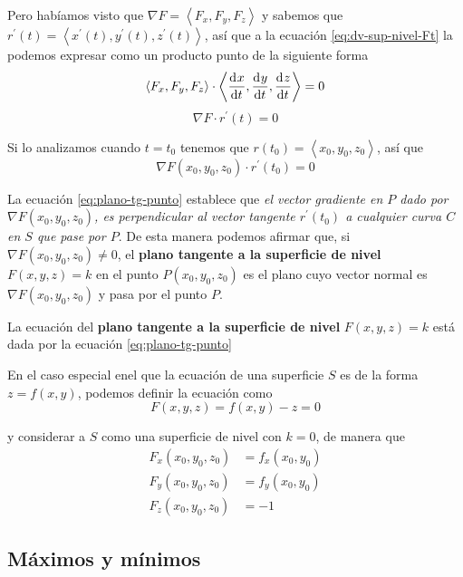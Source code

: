 \documentclass[12pt]{article}
\begin{document}
Pero habíamos visto que $ \nabla F = \left\langle F_{x}, F_{y}, F_{z} \right\rangle $ y sabemos que $ r^{\prime}(t)=\left\langle x^{\prime}(t),y^{\prime}(t),z^{\prime}(t) \right\rangle $, así que a la ecuación \ref{eq:dv-sup-nivel-Ft} la podemos expresar como un producto punto de la siguiente forma
\[
  \left\langle F_{x},F_{y},F_{z} \right\rangle\cdot \left\langle \dv[]{x}{t},\dv[]{y}{t},\dv[]{z}{t} \right\rangle = 0
\]
\begin{equation}\label{eq:grad-plano-tg}
  \nabla F\cdot r^{\prime}(t)=0
\end{equation}

Si lo analizamos cuando $ t = t_{0} $ tenemos que $ r(t_{0})=\left\langle x_{0},y_{0},z_{0} \right\rangle $, así que
\begin{equation}\label{eq:plano-tg-punto}
  \nabla F(x_{0},y_{0},z_{0})\cdot r^{\prime}(t_{0})=0
\end{equation}

La ecuación \ref{eq:plano-tg-punto} establece que \textit{el vector gradiente en $ P $ dado por $ \nabla F(x_{0},y_{0},z_{0}) $, es perpendicular al vector tangente $ r^{\prime}(t_{0}) $ a cualquier curva $ C $ en $ S $ que pase por $ P $}. De esta manera podemos afirmar que, si $ \nabla F(x_{0},y_{0},z_{0})\neq 0 $, el \textbf{plano tangente a la superficie de nivel} $ F(x,y,z) = k $ en el punto $ P(x_{0},y_{0},z_{0}) $ es el plano cuyo vector normal es $ \nabla F(x_{0},y_{0},z_{0}) $ y pasa por el punto $ P $.

La ecuación del \textbf{plano tangente a la superficie de nivel} $ F(x,y,z) = k $ está dada por la ecuación \ref{eq:plano-tg-punto}

En el caso especial enel que la ecuación de una superficie $ S $ es de la forma $ z=f(x,y) $, podemos definir la ecuación como
\[
  F(x,y,z) = f(x,y) - z = 0
\]

y considerar a $ S $ como una superficie de nivel con $ k=0 $, de manera que
\begin{align*}
  F_{x}(x_{0},y_{0},z_{0}) &= f_{x}(x_{0},y_{0})\\
  F_{y}(x_{0},y_{0},z_{0}) &= f_{y}(x_{0},y_{0})\\
  F_{z}(x_{0},y_{0},z_{0}) &= -1
\end{align*}

\subsection{Máximos y mínimos}
\vspace{0.2cm}
\vspace{0.2cm}
\end{document}
